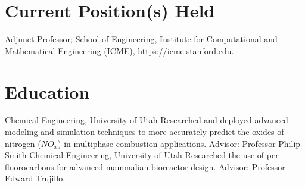\documentclass[letterpaper]{twentysecondcv_spd} %
\begin{document}

\section{Current Position(s) Held}

\begin{twentyshort} %
  	 {Adjunct Professor; School of Engineering, Institute for Computational and Mathematical Engineering (ICME), \underline{https://icme.stanford.edu}.}
  \end{twentyshort}
  

\section{Education}

\begin{twenty} %
	 {\normalfont Chemical Engineering, University of Utah} {Researched and deployed advanced
modeling and simulation techniques to more accurately predict the oxides of nitrogen ($NO_x$) in multiphase combustion applications. Advisor: Professor Philip Smith}
	 {\normalfont Chemical Engineering, University of Utah} {Researched the use of per-fluorocarbons for advanced mammalian bioreactor design. Advisor: Professor Edward Trujillo.}
\end{twenty}

\end{document}
